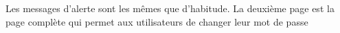 \documentclass{article}
\begin{document}
\begin{enumerate}
\hspace*{-0.7in}

               \noindent{}  
               
               Les messages d'alerte sont les mêmes que d'habitude. La deuxième page est la page complète qui permet aux utilisateurs de changer leur mot de passe
  
  \vspace{0.7cm}
   
\hspace*{-0.7in}

               \noindent{}  
               

\end{enumerate}
\end{document}
